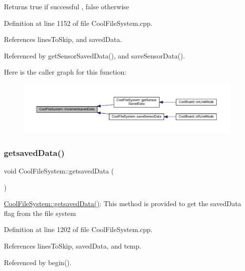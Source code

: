 \begin{DoxyReturn}{Returns}
true if successful , false otherwise 
\end{DoxyReturn}


Definition at line 1152 of file Cool\+File\+System.\+cpp.



References lines\+To\+Skip, and saved\+Data.



Referenced by get\+Sensor\+Saved\+Data(), and save\+Sensor\+Data().

Here is the caller graph for this function\+:
\nopagebreak
\begin{figure}[H]
\begin{center}
\leavevmode
\includegraphics[width=350pt]{db/d0c/class_cool_file_system_aae045125288f255f3e258073dcada2a6_icgraph}
\end{center}
\end{figure}
\mbox{\label{class_cool_file_system_a70701d05e811604af1b531f4f6dc69ed}} 
\subsubsection{\texorpdfstring{getsaved\+Data()}{getsavedData()}}
{\footnotesize\ttfamily void Cool\+File\+System\+::getsaved\+Data (\begin{DoxyParamCaption}{ }\end{DoxyParamCaption})}

\hyperlink{class_cool_file_system_a70701d05e811604af1b531f4f6dc69ed}{Cool\+File\+System\+::getsaved\+Data()}\+: This method is provided to get the saved\+Data flag from the file system 

Definition at line 1202 of file Cool\+File\+System.\+cpp.



References lines\+To\+Skip, saved\+Data, and temp.



Referenced by begin().

